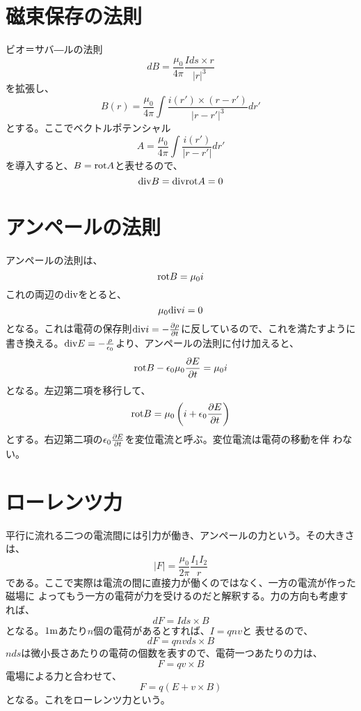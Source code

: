     \section{磁束保存の法則}
        ビオ＝サバ―ルの法則
            \[dB = \frac{\mu_0}{4\pi}\frac{Ids\times r}{|r|^3}\]
        を拡張し、
            \[B(r) = \frac{\mu_0}{4\pi}
            \int \frac{i(r')\times (r-r')}{|r-r'|^3}dr'\]
        とする。ここでベクトルポテンシャル
            \[A = \frac{\mu_0}{4\pi}\int \frac{i(r')}{|r-r'|}dr'\]
        を導入すると、$B=\rot A$と表せるので、
            \[\dive B=\dive\rot A=0\]
    \section{アンペールの法則}
        アンペールの法則は、
            \[\rot B = \mu_0i\]
        これの両辺の$\dive$をとると、
            \[\mu_0\dive i = 0\]
        となる。これは電荷の保存則$\dive i = -\pd[\rho]{t}$に反しているので、これを満たすように
        書き換える。$\dive E = -\frac{\rho}{\epsilon_0}$より、アンペールの法則に付け加えると、
            \[\rot B - \epsilon_0\mu_0\pd[E]{t} = \mu_0 i\]
        となる。左辺第二項を移行して、
            \[\rot B = \mu_0\lr{i + \epsilon_0\pd[E]{t}}\]
        とする。右辺第二項の$\epsilon_0\pd[E]{t}$を変位電流と呼ぶ。変位電流は電荷の移動を伴
        わない。
    \section{ローレンツ力}
        平行に流れる二つの電流間には引力が働き、アンペールの力という。その大きさは、
            \[|F| = \frac{\mu_0}{2\pi}\frac{I_1 I_2}{r}\]
        である。ここで実際は電流の間に直接力が働くのではなく、一方の電流が作った磁場に
        よってもう一方の電荷が力を受けるのだと解釈する。力の方向も考慮すれば、
            \[dF = Ids\times B\]
        となる。$1\rm{m}$あたり$n$個の電荷があるとすれば、$I=qnv$と
        表せるので、
            \[dF = qnvds\times B\]
        $nds$は微小長さあたりの電荷の個数を表すので、電荷一つあたりの力は、
            \[F = qv\times B\]
        電場による力と合わせて、
            \[F = q(E+v\times B)\]
        となる。これをローレンツ力という。
